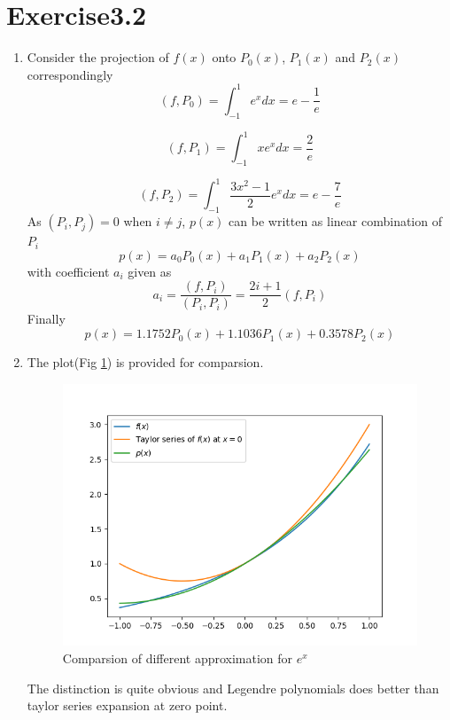 \documentclass[paper=a4, fontsize=11pt]{scrartcl} %
\numberwithin{equation}{section} %
\numberwithin{figure}{section} %
\numberwithin{table}{section} %
\begin{document}
\section{Exercise3.2}
	\begin{enumerate}
		\item 
			Consider the projection of $f(x)$ onto $P_0(x)$, $P_1(x)$ and $P_2(x)$ correspondingly
			\begin{equation}
				(f, P_0) = \int_{-1}^{1} e^x dx = e - \frac{1}{e}
			\end{equation} 
			
			\begin{equation}
				(f, P_1) = \int_{-1}^{1} x e^x dx = \frac{2}{e}
			\end{equation}
			
			\begin{equation}
				(f, P_2) = \int_{-1}^{1} \frac{3x^2 -1}{2} e^x dx = e - \frac{7}{e}
			\end{equation}
			As $(P_i, P_j)=0$ when $i \neq j$, $p(x)$ can be written as linear combination of $P_i$
			\begin{equation}
				p(x) = a_0 P_0(x) + a_1 P_1(x) + a_2 P_2(x)
			\end{equation}
			with coefficient $a_i$ given as
			\begin{equation}
				a_i = \frac{(f, P_i)}{(P_i, P_i)} = \frac{2i+1}{2} (f, P_i)
			\end{equation}
			Finally
			\begin{equation}
				p(x) = 1.1752 P_0(x) + 1.1036 P_1(x) + 0.3578 P_2(x)
			\end{equation}
			
		\item 
		The plot(Fig \ref{fig:comp}) is provided for comparsion.
	
		\begin{figure}[!htbp]
			\centering
			\includegraphics[]{ApproximationCompare.png}
			\caption{Comparsion of different approximation for $e^x$}
			\label{fig:comp}
		\end{figure}
	
		The distinction is quite obvious and Legendre polynomials does better than taylor series expansion at zero point.
	
	\end{enumerate}
\end{document}

